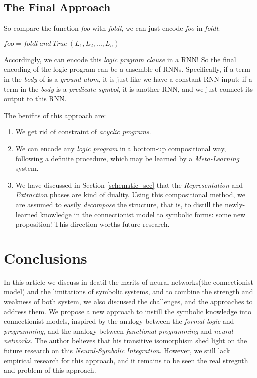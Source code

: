\documentclass[letterpaper,10pt]{article}
\theoremstyle{definition}
\begin{document}
\subsection{The Final Approach}

So compare the function \emph{foo} with \emph{foldl}, we can just encode \emph{foo} in \emph{foldl}:

\begin{center}	
$ foo = foldl\ and\ True\  (L_1, L_2, ..., L_n)$
\end{center}

Accordingly, we can encode this \emph{logic program clause} in a RNN!  So the final encoding of the logic program can be a ensemble of RNNs. Specifically, if a term in the \emph{body} of is a \emph{ground atom}, it is just like we have a constant RNN input;  if a term in the \emph{body} is a \emph{predicate symbol}, it is another RNN, and we just connect its output to this RNN.

The benifits of this approach are:

\begin{enumerate}[noitemsep]
\item We get rid of constraint of \emph{acyclic programs}.
\item We can encode any \emph{logic program} in a bottom-up compositional way, following a definite procedure, which may be learned by a \emph{Meta-Learning} system.
\item We have discussed in Section \ref{schematic_sec} that the \emph{Representation} and \emph{Extraction} phases are kind of duality. Using this compositional method, we are assumed to easily \emph{decompose} the structure, that is, to distill the newly-learned knowledge in the connectionist model to symbolic forms: some new proposition! This direction worths future research.
\end{enumerate}


\section{Conclusions}\label{conclusion_sec}

In this article we discuss in deatil the merits of neural networks(the connectionist model) and the limitations of symbolic systems, and to combine the strength and weakness of both system, we also discussed the challenges, and the approaches to address them. We propose a new approach to instill the symbolic knowledge into connectionist models, inspired by the analogy between the \emph{formal logic} and \emph{programming}, and the analogy between \emph{functional programming} and \emph{neural networks}. The author believes that his transitive  isomorphism shed light on the future research on this \emph{Neural-Symbolic Integration}. However, we still lack empirical research for this approach, and it remains to be seen the real stregnth and problem of this approach.

{\footnotesize 
}
\end{document}
